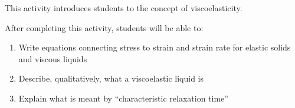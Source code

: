 %
%
%
%

\renewcommand{\figpath}{content/polymphys/mechanical-properties/viscoelasticity/figs}
\renewcommand{\labelbase}{viscoelasticity}

\begin{activity}

\begin{instructornotes}

	This activity introduces students to the concept of viscoelasticity.
	
	After completing this activity, students will be able to:
			\begin{enumerate}
				\item Write equations connecting stress to strain and strain rate for elastic solids and viscous liquids
				\item Describe, qualitatively, what a viscoelastic liquid is
				\item Explain what is meant by ``characteristic relaxation time''
			\end{enumerate}
	
			

\end{instructornotes}
\end{activity}
